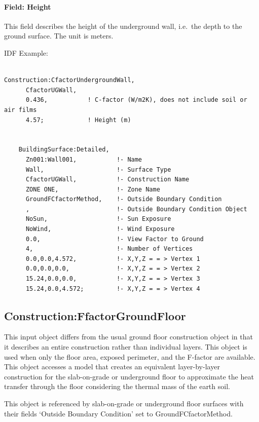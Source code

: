 \paragraph{Field: Height}\label{field-height}

This field describes the height of the underground wall, i.e.~the depth to the ground surface. The unit is meters.

IDF Example:

\begin{lstlisting}

Construction:CfactorUndergroundWall,
      CfactorUGWall,
      0.436,           ! C-factor (W/m2K), does not include soil or air films
      4.57;            ! Height (m)


    BuildingSurface:Detailed,
      Zn001:Wall001,           !- Name
      Wall,                    !- Surface Type
      CfactorUGWall,           !- Construction Name
      ZONE ONE,                !- Zone Name
      GroundFCfactorMethod,    !- Outside Boundary Condition
      ,                        !- Outside Boundary Condition Object
      NoSun,                   !- Sun Exposure
      NoWind,                  !- Wind Exposure
      0.0,                     !- View Factor to Ground
      4,                       !- Number of Vertices
      0.0,0.0,4.572,           !- X,Y,Z = = > Vertex 1
      0.0,0.0,0.0,             !- X,Y,Z = = > Vertex 2
      15.24,0.0,0.0,           !- X,Y,Z = = > Vertex 3
      15.24,0.0,4.572;         !- X,Y,Z = = > Vertex 4
\end{lstlisting}

\subsection{Construction:FfactorGroundFloor}\label{constructionffactorgroundfloor}

This input object differs from the usual ground floor construction object in that it describes an entire construction rather than individual layers. This object is used when only the floor area, exposed perimeter, and the F-factor are available.~ This object accesses a model that creates an equivalent layer-by-layer construction for the slab-on-grade or underground floor to approximate the heat transfer through the floor considering the thermal mass of the earth soil.

This object is referenced by slab-on-grade or underground floor surfaces with their fields `Outside Boundary Condition' set to GroundFCfactorMethod.

